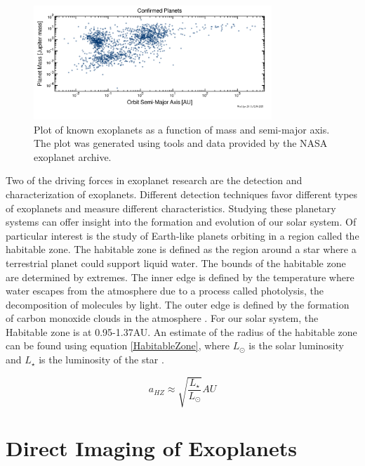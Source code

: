 \begin{figure}
    \centering
    \includegraphics[width=0.8\textwidth]{Chapter Materials/Introduction Materials/MassVsSemiAxis.png}
    \caption{Plot of known exoplanets as a function of mass and semi-major axis. The plot was generated using tools and data provided by the NASA exoplanet archive.}
    \label{fig:massVsemi}
\end{figure}

Two of the driving forces in exoplanet research are the detection and characterization of exoplanets. Different detection techniques favor different types of exoplanets and measure different characteristics. Studying these planetary systems can offer insight into the formation and evolution of our solar system. Of particular interest is the study of Earth-like planets orbiting in a region called the habitable zone. The habitable zone is defined as the region around a star where a terrestrial planet could support liquid water. The bounds of the habitable zone are determined by extremes. The inner edge is defined by the temperature where water escapes from the atmosphere due to a process called photolysis, the decomposition of molecules by light. The outer edge is defined by the formation of carbon monoxide clouds in the atmosphere \citep{seager2010exoplanets}. For our solar system, the Habitable zone is at 0.95-1.37AU. An estimate of the radius of the habitable zone can be found using equation \ref{HabitableZone}, where $L_{\odot}$ is the solar luminosity and $L_{\star}$ is the luminosity of the star \citep{males2014direct}.



\begin{equation}
    a_{HZ} \approx \sqrt{\frac{L_\star}{L_{\odot}}}AU
    \label{HabitableZone}
\end{equation}



\section{Direct Imaging of Exoplanets}

